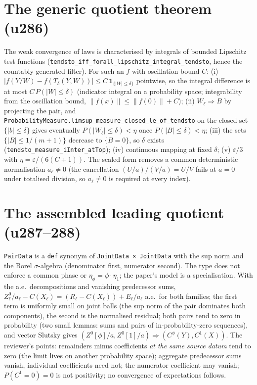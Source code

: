 \documentclass[11pt]{article}
\begin{document}
\section{The generic quotient theorem (u286)}
The weak convergence of laws is characterised by integrals of bounded Lipschitz test functions
(\texttt{tendsto\_iff\_forall\_lipschitz\_integral\_tendsto}, hence the countably generated filter). For
such an $f$ with oscillation bound $C$: (i) $|f(Y/W)-f(T_\delta(Y,W))|\le C\,\mathbf 1_{\{|W|\le\delta\}}$
pointwise, so the integral difference is at most $C\,P(|W|\le\delta)$ (indicator integral on a probability
space; integrability from the oscillation bound, $\|f(x)\|\le\|f(0)\|+C$); (ii) $W_\ell\Rightarrow B$ by
projecting the pair, and \texttt{ProbabilityMeasure.limsup\_measure\_closed\_le\_of\_tendsto} on the closed
set $\{|b|\le\delta\}$ gives eventually $P(|W_\ell|\le\delta)<\eta$ once $P(|B|\le\delta)<\eta$; (iii) the
sets $\{|B|\le1/(m+1)\}$ decrease to $\{B=0\}$, so $\delta$ exists (\texttt{tendsto\_measure\_iInter\_atTop});
(iv) continuous mapping at fixed $\delta$; (v) $\varepsilon/3$ with $\eta=\varepsilon/(6(C+1))$. The scaled
form removes a common deterministic normalisation $a_\ell\ne0$ (the cancellation
$(U/a)/(V/a)=U/V$ fails at $a=0$ under totalised division, so $a_\ell\ne0$ is required at every index).

\section{The assembled leading quotient (u287--288)}
\texttt{PairData} is a \texttt{def} synonym of \texttt{JointData × JointData} with the sup norm and the
Borel $\sigma$-algebra (denominator first, numerator second). The type does not enforce a common phase
or $\eta_\phi=\phi\cdot\eta_1$; the paper's model is a specialisation. With the a.e.\ decompositions and
vanishing predecessor sums,
$Z^0_\ell/a_\ell-C(X_\ell)=(R_\ell-C(X_\ell))+E_\ell/a_\ell$ a.e.\ for both families; the first term is
uniformly small on joint balls (the sup norm of the pair dominates both components), the second is the
normalised residual; both pairs tend to zero in probability (two small lemmas: sums and pairs of
in-probability-zero sequences), and vector Slutsky gives $(Z^0[\phi]/a,Z^0[1]/a)\Rightarrow(C^\phi(Y),C^1(X))$.
The reviewer's points: remainders minus coefficients \emph{at the same source datum} tend to zero (the
limit lives on another probability space); aggregate predecessor sums vanish, individual coefficients
need not; the numerator coefficient may vanish; $P(C^1=0)=0$ is not positivity; no convergence of
expectations follows.
\end{document}
